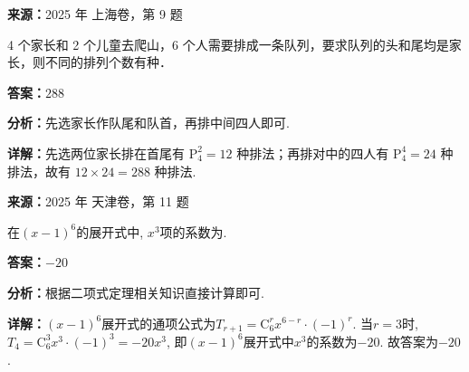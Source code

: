 \begin{question}[points=5]
\textbf{来源：}2025 年 上海卷，第 9 题\par
4 个家长和 2 个儿童去爬山，6 个人需要排成一条队列，要求队列的头和尾均是家长，则不同的排列个数有种．
\fillin[{$288$}]
\begin{solution}
\textbf{答案：}$288$

\textbf{分析：}先选家长作队尾和队首，再排中间四人即可.

\textbf{详解：}先选两位家长排在首尾有 $\mathrm{P}_4^2 = 12$ 种排法；再排对中的四人有 $\mathrm{P}_4^4 = 24$ 种排法，故有 $12 \times 24 = 288$ 种排法.
\end{solution}
\end{question}

\begin{question}[points=5]
\textbf{来源：}2025 年 天津卷，第 11 题\par
在$(x-1)^6$的展开式中, $x^3$项的系数为.
\fillin[{$-20$}]
\begin{solution}
\textbf{答案：}$-20$

\textbf{分析：}根据二项式定理相关知识直接计算即可.

\textbf{详解：}$(x-1)^6$展开式的通项公式为$T_{r+1} = \mathrm{C}_6^r x^{6-r} \cdot (-1)^r$. 当$r=3$时, $T_4 = \mathrm{C}_6^3 x^3 \cdot (-1)^3 = -20x^3$, 即$(x-1)^6$展开式中$x^3$的系数为$-20$. 故答案为$-20$.
\end{solution}
\end{question}

